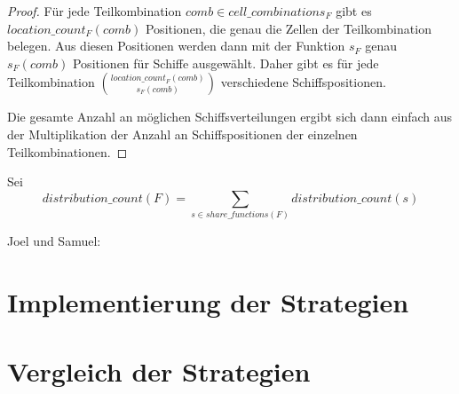 \documentclass[a4paper,12pt]{llncs}
\numberwithin{equation}{section}
\begin{document}
\begin{proof}
Für jede Teilkombination $comb \in cell\_combinations_F$ gibt es $location\_count_F(comb)$ Positionen, die genau die Zellen der Teilkombination belegen. Aus diesen Positionen werden dann mit der Funktion $s_F$ genau $s_F(comb)$ Positionen für Schiffe ausgewählt. Daher gibt es für jede Teilkombination ${location\_count_F(comb)\choose s_F(comb)}$ verschiedene Schiffspositionen.

Die gesamte Anzahl an möglichen Schiffsverteilungen ergibt sich dann einfach aus der Multiplikation der Anzahl an Schiffspositionen der einzelnen Teilkombinationen.
\end{proof}

\begin{definition}
Sei
\[
distribution\_count(F)=\sum_{s \in share\_functions(F)}{distribution\_count(s)}
\]
\end{definition}

Joel und Samuel:

\section{Implementierung der Strategien}

\section{Vergleich der Strategien}


\newpage

 

\end{document}
